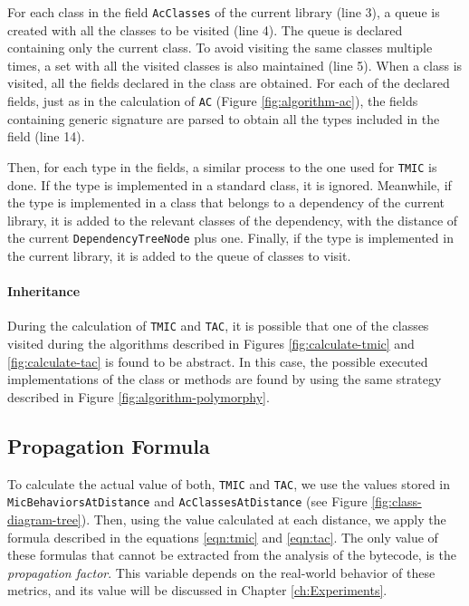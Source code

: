 For each class in the field \texttt{AcClasses} of the current library (line 3), a queue is created with all the classes to be visited (line 4). The queue is declared containing only the current class. To avoid visiting the same classes multiple times, a set with all the visited classes is also maintained (line 5). When a class is visited, all the fields declared in the class are obtained. For each of the declared fields, just as in the calculation of \texttt{AC} (Figure \ref{fig:algorithm-ac}), the fields containing generic signature are parsed to obtain all the types included in the field (line 14).

Then, for each type in the fields, a similar process to the one used for \texttt{TMIC} is done. If the type is implemented in a standard class, it is ignored. Meanwhile, if the type is implemented in a class that belongs to a dependency of the current library, it is added to the relevant classes of the dependency, with the distance of the current \texttt{DependencyTreeNode} plus one. Finally, if the type is implemented in the current library, it is added to the queue of classes to visit.

\paragraph{Inheritance}
During the calculation of \texttt{TMIC} and \texttt{TAC}, it is possible that one of the classes visited during the algorithms described in Figures \ref{fig:calculate-tmic} and \ref{fig:calculate-tac} is found to be abstract. In this case, the possible executed implementations of the class or methods are found by using the same strategy described in Figure \ref{fig:algorithm-polymorphy}.

\subsection{Propagation Formula}
To calculate the actual value of both, \texttt{TMIC} and \texttt{TAC}, we use the values stored in \texttt{MicBehaviorsAtDistance} and \texttt{AcClassesAtDistance} (see Figure \ref{fig:class-diagram-tree}). Then, using the value calculated at each distance, we apply the formula described in the equations \ref{eqn:tmic} and \ref{eqn:tac}. The only value of these formulas that cannot be extracted from the analysis of the bytecode, is the \textit{propagation factor}. This variable depends on the real-world behavior of these metrics, and its value will be discussed in Chapter \ref{ch:Experiments}.

